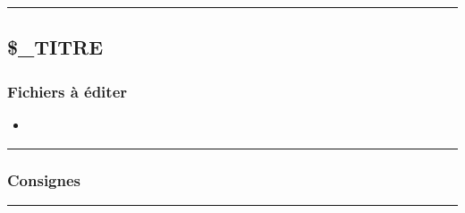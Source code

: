 \documentclass[a4paper,10pt]{article}
\begin{document}

\color{green}\par\noindent\rule{\textwidth}{0.4pt}\color{white}

\color{green}
\subsection{\$\_TITRE}\color{white}

\color{blue}
\subsubsection{Fichiers à éditer}\color{white}
\begin{itemize}
    \item \textbf{\color{lime}\color{white}}
\end{itemize}



\color{blue}\par\noindent\rule{\textwidth}{0.4pt}\color{white}

\color{blue}
\subsubsection{Consignes}\color{white}



\color{green}\par\noindent\rule{\textwidth}{0.4pt}\color{white}
\end{document}
